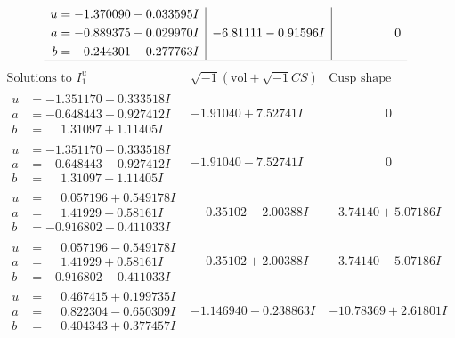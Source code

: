 \documentclass[1p]{elsarticle_modified}
\theoremstyle{definition}
\newcommand{\I}{\sqrt{-1}}
\begin{document}
$$\begin{array}{c|c|c}
\begin{aligned}
u &= -1.370090 - 0.033595 I \\
a &= -0.889375 - 0.029970 I \\
b &= \phantom{-}0.244301 - 0.277763 I\end{aligned}
 & -6.81111 - 0.91596 I & \phantom{-0.000000 } 0\\
 \hline 
 \end{array}$$\newpage$$\begin{array}{c|c|c}  
\text{Solutions to }I^u_{1}& \I (\text{vol} + \sqrt{-1}CS) & \text{Cusp shape}\\
 \hline 
\begin{aligned}
u &= -1.351170 + 0.333518 I \\
a &= -0.648443 + 0.927412 I \\
b &= \phantom{-}1.31097 + 1.11405 I\end{aligned}
 & -1.91040 + 7.52741 I & \phantom{-0.000000 } 0 \\ \hline\begin{aligned}
u &= -1.351170 - 0.333518 I \\
a &= -0.648443 - 0.927412 I \\
b &= \phantom{-}1.31097 - 1.11405 I\end{aligned}
 & -1.91040 - 7.52741 I & \phantom{-0.000000 } 0 \\ \hline\begin{aligned}
u &= \phantom{-}0.057196 + 0.549178 I \\
a &= \phantom{-}1.41929 - 0.58161 I \\
b &= -0.916802 + 0.411033 I\end{aligned}
 & \phantom{-}0.35102 - 2.00388 I & -3.74140 + 5.07186 I \\ \hline\begin{aligned}
u &= \phantom{-}0.057196 - 0.549178 I \\
a &= \phantom{-}1.41929 + 0.58161 I \\
b &= -0.916802 - 0.411033 I\end{aligned}
 & \phantom{-}0.35102 + 2.00388 I & -3.74140 - 5.07186 I \\ \hline\begin{aligned}
u &= \phantom{-}0.467415 + 0.199735 I \\
a &= \phantom{-}0.822304 - 0.650309 I \\
b &= \phantom{-}0.404343 + 0.377457 I\end{aligned}
 & -1.146940 - 0.238863 I & -10.78369 + 2.61801 I \\ \hline\begin{aligned}

\end{aligned}
\end{array}$$
\end{document}
